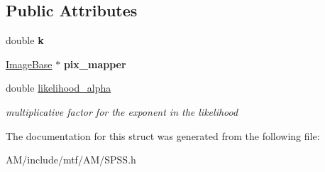 \subsection*{Public Attributes}
\begin{DoxyCompactItemize}
\item 
\hypertarget{structSPSSParams_a9673920910c0593633981568d65fbba7}{double {\bfseries k}}\label{structSPSSParams_a9673920910c0593633981568d65fbba7}

\item 
\hypertarget{structSPSSParams_a2d0208d23c18f1aa1322b3be9d97208f}{\hyperlink{classImageBase}{Image\-Base} $\ast$ {\bfseries pix\-\_\-mapper}}\label{structSPSSParams_a2d0208d23c18f1aa1322b3be9d97208f}

\item 
\hypertarget{structSPSSParams_a9f47f5c1d11aa0f89d366083da7df816}{double \hyperlink{structSPSSParams_a9f47f5c1d11aa0f89d366083da7df816}{likelihood\-\_\-alpha}}\label{structSPSSParams_a9f47f5c1d11aa0f89d366083da7df816}

\begin{DoxyCompactList}\small\item\em multiplicative factor for the exponent in the likelihood \end{DoxyCompactList}\end{DoxyCompactItemize}


The documentation for this struct was generated from the following file\-:\begin{DoxyCompactItemize}
\item 
A\-M/include/mtf/\-A\-M/S\-P\-S\-S.\-h\end{DoxyCompactItemize}
